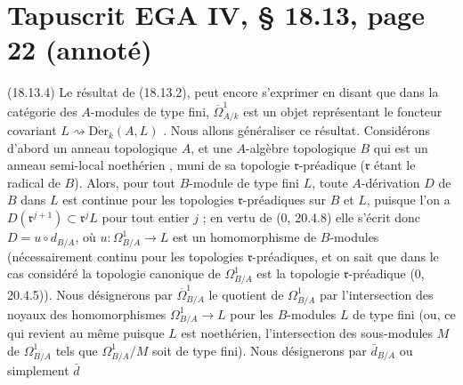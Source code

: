 \documentclass[11pt,a4paper]{article}
\begin{document}
\section*{Tapuscrit EGA IV, § 18.13, page 22 (annoté)}



(18.13.4) Le résultat de (18.13.2),  peut encore s'exprimer en disant que dans la catégorie des
$A$-modules de type fini, $\overline{\Omega}^1_{A/k}$ est un objet
représentant le foncteur covariant $L \rightsquigarrow
\mathrm{D\acute{e}r}_k(A, L)$ . Nous allons généraliser ce résultat. Considérons d'abord un
anneau topologique $A$, et une $A$-algèbre topologique $B$ qui est un anneau
semi-local noethérien  , muni de sa topologie $\mathfrak{r}$-préadique
($\mathfrak{r}$ étant le radical de $B$). Alors, pour tout $B$-module de type
fini $L$, toute $A$-dérivation $D$ de $B$ dans $L$ est continue pour les
topologies $\mathfrak{r}$-préadiques sur $B$ et $L$, puisque l'on a
$D(\mathfrak{r}^{j+1}) \subset \mathfrak{r}^j L$ pour tout entier $j$ ; en
vertu de (0, 20.4.8) elle s'écrit donc $D = u \circ d_{B/A}$, où $u :
\Omega^1_{B/A} \to L$ est un homomorphisme de $B$-modules (nécessairement
continu pour les topologies $\mathfrak{r}$-préadiques, et on sait que dans le
cas considéré la topologie canonique  de
$\Omega^1_{B/A}$ est la topologie \struck{\ill{}} $\mathfrak{r}$-préadique
(0, 20.4.5)). Nous désignerons par $\overline{\Omega}^1_{B/A}$ le quotient de
$\Omega^1_{B/A}$ par l'intersection des noyaux des homomorphismes
$\Omega^1_{B/A} \to L$ pour les $B$-modules $L$  de type fini (ou, ce qui revient au même puisque $L$ est
noethérien, l'intersection des sous-modules $M$ de $\Omega^1_{B/A}$ tels que
$\Omega^1_{B/A}/M$ soit de type fini).   Nous désignerons par $\bar d_{B/A}$ ou simplement $\bar d$
\end{document}
